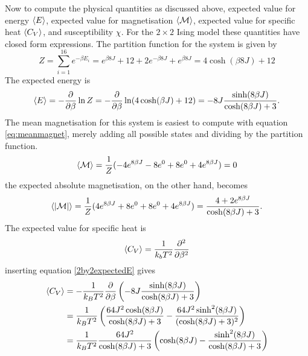 \documentclass[10pt,a4paper]{amsart}
\begin{document}
Now to compute the physical quantities as discussed above, expected value for energy $\ev{E}$, expected value for magnetisation $\ev{\mathcal{M}}$, expected value for specific heat $\ev{C_V}$, and susceptibility $\chi$. For the $2\times2$ Ising model these quantities have closed form expressions. The partition function for the system is given by
\begin{equation}
\label{2by2partition}
Z = \sum_{i=1}^16 e^{-\beta E_i} = e^{\beta8J} + 12 + 2e^{-\beta8J} + e^{\beta8J} = 4\cosh(\beta8J) + 12
\end{equation}
The expected energy is
\begin{equation}
\label{2by2expectedE}
\ev{E} = -\frac{\partial}{\partial\beta} \ln Z = -\frac{\partial}{\partial \beta}\ln(4\cosh(\beta J) + 12)
 = -8J \frac{\sinh(8\beta J)}{\cosh(8\beta J) + 3}.
\end{equation}
The mean magnetisation for this system is easiest to compute with equation \ref{eq:meanmagnet}, merely adding all possible states and dividing by the partition function.
\begin{equation}
\label{eq:2by2meanmagnet}
\ev{\mathcal{M}}= \frac{1}{Z}(-4e^{8\beta J} - 8e^0 + 8e^0 +4e^{8\beta J}) = 0
\end{equation}
the expected absolute magnetisation, on the other hand, becomes
\begin{equation}
\label{eq:2by2absmeanmagnet}
\ev{\abs{\mathcal{M}}} = \frac{1}{Z}(4e^{8\beta J} + 8e^0 + 8e^0 + 4e^{8\beta J}) = \frac{4 +2 e^{8\beta J}}{\cosh(8\beta J) +3}.
\end{equation}
The expected value for specific heat is
\begin{equation}
\label{eq:2by2specificheat}
\ev{C_V} = \frac{1}{k_bT^2}\frac{\partial^2}{\partial\beta^2}
\end{equation}
inserting equation \ref{2by2expectedE} gives
\begin{align*}
\ev{C_V} 	&= -\frac{1}{k_BT^2}\frac{\partial}{\partial\beta}\left(-8J\frac{\sinh(8\beta J)}{\cosh(8\beta J)+3} \right) \\
			&= \frac{1}{k_BT^2}\left(\frac{64J^2\cosh(8\beta J)}{\cosh(8\beta J)+3}-\frac{64J^2\sinh^2(8\beta J)}{(\cosh(8\beta J)+3)^2}\right) \\
			&= \frac{1}{k_BT^2}\frac{64J^2}{\cosh(8\beta J) + 3}\left(\cosh(8\beta J) - \frac{\sinh^2(8\beta J)}{\cosh(8\beta J) +3} \right)
\end{align*}
\end{document}
